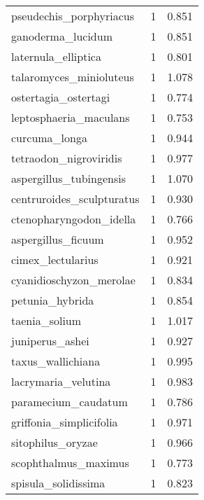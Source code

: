\begin{tabular}{lrr}
        pseudechis\_porphyriacus &                   1 &     0.851 \\
              ganoderma\_lucidum &                   1 &     0.851 \\
            laternula\_elliptica &                   1 &     0.801 \\
        talaromyces\_minioluteus &                   1 &     1.078 \\
           ostertagia\_ostertagi &                   1 &     0.774 \\
         leptosphaeria\_maculans &                   1 &     0.753 \\
                  curcuma\_longa &                   1 &     0.944 \\
         tetraodon\_nigroviridis &                   1 &     0.977 \\
        aspergillus\_tubingensis &                   1 &     1.070 \\
      centruroides\_sculpturatus &                   1 &     0.930 \\
        ctenopharyngodon\_idella &                   1 &     0.766 \\
             aspergillus\_ficuum &                   1 &     0.952 \\
              cimex\_lectularius &                   1 &     0.921 \\
        cyanidioschyzon\_merolae &                   1 &     0.834 \\
                petunia\_hybrida &                   1 &     0.854 \\
                  taenia\_solium &                   1 &     1.017 \\
                juniperus\_ashei &                   1 &     0.927 \\
              taxus\_wallichiana &                   1 &     0.995 \\
            lacrymaria\_velutina &                   1 &     0.983 \\
            paramecium\_caudatum &                   1 &     0.786 \\
        griffonia\_simplicifolia &                   1 &     0.971 \\
              sitophilus\_oryzae &                   1 &     0.966 \\
           scophthalmus\_maximus &                   1 &     0.773 \\
            spisula\_solidissima &                   1 &     0.823 \\

\end{tabular}
